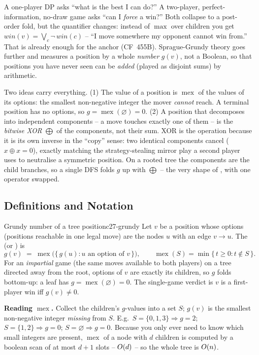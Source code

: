 A one-player DP asks ``what is the best I can do?'' A two-player, perfect-information,
no-draw game asks ``can I \emph{force} a win?'' Both collapse to a post-order fold, but
the quantifier changes: instead of $\max$ over children you get
$\mathit{win}(v) = \bigvee_c \neg\,\mathit{win}(c)$ -- ``I move somewhere my opponent
cannot win from.'' That is already enough for the anchor (CF~455B). Sprague-Grundy
theory goes further and measures a position by a whole \emph{number} $g(v)$, not a
Boolean, so that positions you have never seen can be \emph{added} (played as disjoint
sums) by arithmetic.

Two ideas carry everything. (1) The value of a position is $\operatorname{mex}$ of the values of its
options: the smallest non-negative integer the mover \emph{cannot} reach. A terminal
position has no options, so $g = \operatorname{mex}(\varnothing) = 0$. (2) A position that decomposes
into independent components -- a move touches exactly one of them -- is the
\emph{bitwise XOR} $\bigoplus$ of the components, not their sum. XOR is the operation
because it is its own inverse in the ``copy'' sense: two identical components cancel
($x \oplus x = 0$), exactly matching the strategy-stealing mirror play a second player
uses to neutralise a symmetric position. On a rooted tree the components are the child
branches, so a single DFS folds $g$ up with $\bigoplus$ -- the very shape of
, with one operator swapped.

\subsection{Definitions and Notation}

\begin{definition}{Grundy number of a tree position}{c27-grundy}
Let $v$ be a position whose options (positions reachable in one legal move) are
the nodes $u$ with an edge $v \to u$. The  (or )
is
\[
  g(v) \;=\; \operatorname{mex}\big(\{\, g(u) : u \text{ an option of } v \,\}\big),
  \qquad \operatorname{mex}(S) = \min\{\, t \ge 0 : t \notin S\,\}.
\]
For an \emph{impartial} game (the same moves available to both players) on a tree
directed away from the root, options of $v$ are exactly its children, so $g$ folds
bottom-up: a leaf has $g = \operatorname{mex}(\varnothing) = 0$. The single-game verdict is
$v$ is a first-player win iff $g(v) \ne 0$.
\end{definition}

\noindent\textbf{Reading $\operatorname{mex}$.} Collect the children's $g$-values into a set $S$;
$g(v)$ is the smallest non-negative integer \emph{missing} from $S$. E.g.\
$S = \{0,1,3\} \Rightarrow g = 2$; $S = \{1,2\} \Rightarrow g = 0$; $S = \varnothing
\Rightarrow g = 0$. Because you only ever need to know which small integers are present,
$\operatorname{mex}$ of a node with $d$ children is computed by a boolean scan of at most $d+1$ slots --
$O(d)$ -- so the whole tree is $O(n)$.


